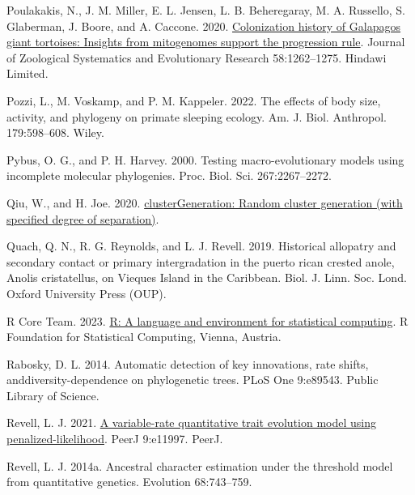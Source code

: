 \documentclass[fleqn,10pt,lineno]{wlpeerj} %
\newlength{\cslhangindent}
\newlength{\cslentryspacingunit} %
\newenvironment{CSLReferences}[2] %
 {%
  \setlength{\parindent}{0pt}
  \ifodd #1
  \let\oldpar\par
  \def\par{\hangindent=\cslhangindent\oldpar}
  \fi
  \setlength{\parskip}{#2\cslentryspacingunit}
 }%
 {}
\begin{document}
\begin{CSLReferences}{1}{0}
\leavevmode{}%
Poulakakis, N., J. M. Miller, E. L. Jensen, L. B. Beheregaray, M. A. Russello, S. Glaberman, J. Boore, and A. Caccone. 2020. \href{https://doi.org/10.1111/jzs.12387}{Colonization history of {G}alapagos giant tortoises: Insights from mitogenomes support the progression rule}. Journal of Zoological Systematics and Evolutionary Research 58:1262--1275. Hindawi Limited.

\leavevmode{}%
Pozzi, L., M. Voskamp, and P. M. Kappeler. 2022. The effects of body size, activity, and phylogeny on primate sleeping ecology. Am. J. Biol. Anthropol. 179:598--608. Wiley.

\leavevmode{}%
Pybus, O. G., and P. H. Harvey. 2000. Testing macro-evolutionary models using incomplete molecular phylogenies. Proc. Biol. Sci. 267:2267--2272.

\leavevmode{}%
Qiu, W., and H. Joe. 2020. \href{https://CRAN.R-project.org/package=clusterGeneration}{clusterGeneration: Random cluster generation (with specified degree of separation)}.

\leavevmode{}%
Quach, Q. N., R. G. Reynolds, and L. J. Revell. 2019. Historical allopatry and secondary contact or primary intergradation in the puerto rican crested anole, {Anolis cristatellus}, on {V}ieques {I}sland in the {C}aribbean. Biol. J. Linn. Soc. Lond. Oxford University Press (OUP).

\leavevmode{}%
R Core Team. 2023. \href{https://www.R-project.org/}{R: A language and environment for statistical computing}. R Foundation for Statistical Computing, Vienna, Austria.

\leavevmode{}%
Rabosky, D. L. 2014. Automatic detection of key innovations, rate shifts, and{d}iversity-{d}ependence on phylogenetic trees. PLoS One 9:e89543. Public Library of Science.

\leavevmode{}%
Revell, L. J. 2021. \href{https://doi.org/10.7717/peerj.11997}{A variable-rate quantitative trait evolution model using penalized-likelihood}. {PeerJ} 9:e11997. {PeerJ}.

\leavevmode{}%
Revell, L. J. 2014a. Ancestral character estimation under the threshold model from quantitative genetics. Evolution 68:743--759.


\end{CSLReferences}
\end{document}
